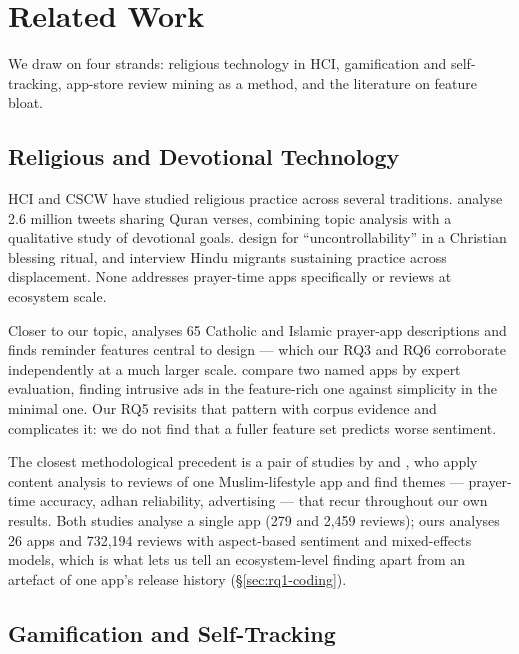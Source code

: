 
\section{Related Work}
\label{sec:related-work}

We draw on four strands: religious technology in HCI, gamification and
self-tracking, app-store review mining as a method, and the literature on
feature bloat.

\subsection{Religious and Devotional Technology}

HCI and CSCW have studied religious practice across several traditions.
\citet{abokhodair2020holytweets} analyse 2.6 million tweets sharing Quran
verses, combining topic analysis with a qualitative study of devotional goals.
\citet{wolf2023blessing} design for ``uncontrollability'' in a Christian
blessing ritual, and \citet{bhattacharjee2025residual} interview Hindu
migrants sustaining practice across displacement. None addresses prayer-time
apps specifically or reviews at ecosystem scale.

Closer to our topic, \citet{bellar2017ipray} analyses 65 Catholic and Islamic
prayer-app descriptions and finds reminder features central to design ---
which our RQ3 and RQ6 corroborate independently at a much larger scale.
\citet{azahari2025comparative} compare two named apps by expert evaluation,
finding intrusive ads in the feature-rich one against simplicity in the
minimal one. Our RQ5 revisits that pattern with corpus evidence and
complicates it: we do not find that a fuller feature set predicts worse
sentiment.

The closest methodological precedent is a pair of studies by
\citet{noor2025halaltourism} and \citet{noor2026halalsuperapps}, who apply
content analysis to reviews of one Muslim-lifestyle app and find themes ---
prayer-time accuracy, adhan reliability, advertising --- that recur throughout
our own results. Both studies analyse a single app (279 and 2,459 reviews);
ours analyses 26 apps and 732,194 reviews with aspect-based sentiment and
mixed-effects models, which is what lets us tell an ecosystem-level finding
apart from an artefact of one app's release history (\S\ref{sec:rq1-coding}).

\subsection{Gamification and Self-Tracking}

